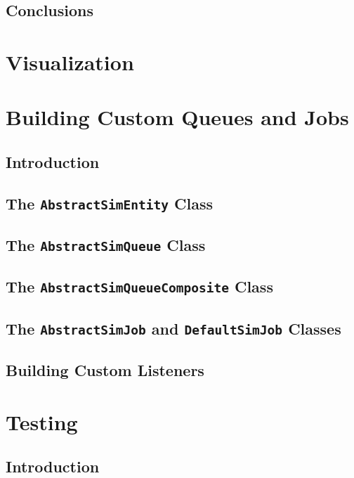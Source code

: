 \documentclass[12pt]{book}
\begin{document}
\section{Conclusions}

\chapter{Visualization}
\label{chap:visualization}

\chapter{Building Custom Queues and Jobs}
\label{chap:custom}

\section{Introduction}

\section{The \lstinline{AbstractSimEntity} Class}

\section{The \lstinline{AbstractSimQueue} Class}

\section{The \lstinline{AbstractSimQueueComposite} Class}

\section{The \lstinline{AbstractSimJob} and \lstinline{DefaultSimJob} Classes}

\section{Building Custom Listeners}

\chapter{Testing}
\label{chap:testing}

\section{Introduction}
\end{document}
